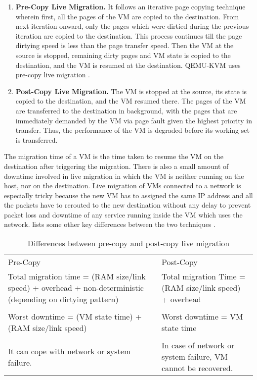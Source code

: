\begin{enumerate}
\item \textbf{Pre-Copy Live Migration.} It follows an iterative page copying technique wherein first, all the pages of the VM are copied to the destination. From next iteration onward, only the pages which were dirtied during the previous iteration are copied to the destination. This process continues till the page dirtying speed is less than the page transfer speed. Then the VM at the source is stopped, remaining dirty pages and VM state is copied to the destination, and the VM is resumed at the destination. QEMU-KVM uses pre-copy live migration \cite{qemu-migration}.

\item \textbf{Post-Copy Live Migration.} The VM is stopped at the source, its state is copied to the destination, and the VM resumed there. The pages of the VM are transferred to the destination in background, with the pages that are immediately demanded by the VM via page fault given the highest priority in transfer. Thus, the performance of the VM is degraded before its working set is transferred.
\end{enumerate}

The migration time of a VM is the time taken to resume the VM on the destination after triggering the migration. There is also a small amount of downtime involved in live migration in which the VM is neither running on the host, nor on the destination. Live migration of VMs connected to a network is especially tricky because the new VM has to assigned the same IP address and all the packets have to rerouted to the new destination without any delay to prevent packet loss and downtime of any service running inside the VM which uses the network.
 lists some other key differences between the two techniques \cite{yabusame}.

\begin{table}[hbt]
\caption{Differences between pre-copy and post-copy live migration}
\label{tab:live-migration}
\begin{center}
\begin{tabularx}{0.91\textwidth}{XX}
\hline\noalign{\smallskip}
Pre-Copy & Post-Copy \\
\noalign{\smallskip}
\hline
\noalign{\smallskip}
Total migration time = (RAM size/link speed) + overhead + non-deterministic  (depending on dirtying pattern) & Total migration Time = (RAM
size/link speed) + overhead \\ \\

Worst downtime =  (VM state time) + (RAM size/link speed) & Worst downtime = VM state time \\ \\

It can cope with network or system failure. & In case of network or system failure, VM cannot be recovered. \\
\hline
\end{tabularx}
\end{center}
\end{table}


